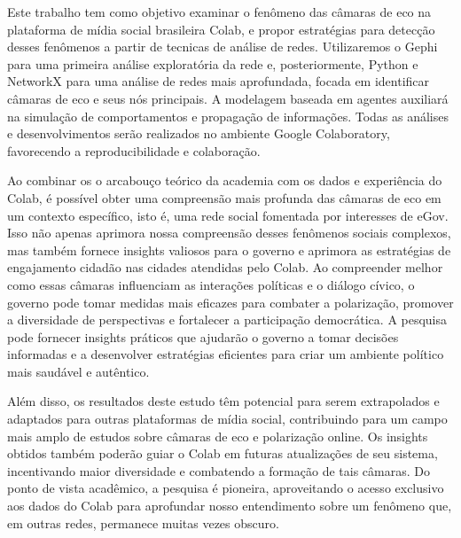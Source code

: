 Este trabalho tem como objetivo examinar o fenômeno das câmaras de eco na plataforma de mídia social brasileira Colab, e propor estratégias para detecção desses fenômenos a partir de tecnicas de análise de redes. Utilizaremos o Gephi para uma primeira análise exploratória da rede e, posteriormente, Python e NetworkX para uma análise de redes mais aprofundada, focada em identificar câmaras de eco e seus nós principais. A modelagem baseada em agentes auxiliará na simulação de comportamentos e propagação de informações. Todas as análises e desenvolvimentos serão realizados no ambiente Google Colaboratory, favorecendo a reproducibilidade e colaboração.

Ao combinar os o arcabouço teórico da academia com os dados e experiência do Colab, é possível obter uma compreensão mais profunda das câmaras de eco em um contexto específico, isto é, uma rede social fomentada por interesses  de eGov. Isso não apenas aprimora nossa compreensão desses fenômenos sociais complexos, mas também fornece insights valiosos para o governo e aprimora as estratégias de engajamento cidadão nas cidades atendidas pelo Colab. Ao compreender melhor como essas câmaras influenciam as interações políticas e o diálogo cívico, o governo pode tomar medidas mais eficazes para combater a polarização, promover a diversidade de perspectivas e fortalecer a participação democrática. A pesquisa pode fornecer insights práticos que ajudarão o governo a tomar decisões informadas e a desenvolver estratégias eficientes para criar um ambiente político mais saudável e autêntico.

Além disso, os resultados deste estudo têm potencial para serem extrapolados e adaptados para outras plataformas de mídia social, contribuindo para um campo mais amplo de estudos sobre câmaras de eco e polarização online. Os insights obtidos também poderão guiar o Colab em futuras atualizações de seu sistema, incentivando maior diversidade e combatendo a formação de tais câmaras. Do ponto de vista acadêmico, a pesquisa é pioneira, aproveitando o acesso exclusivo aos dados do Colab para aprofundar nosso entendimento sobre um fenômeno que, em outras redes, permanece muitas vezes obscuro.